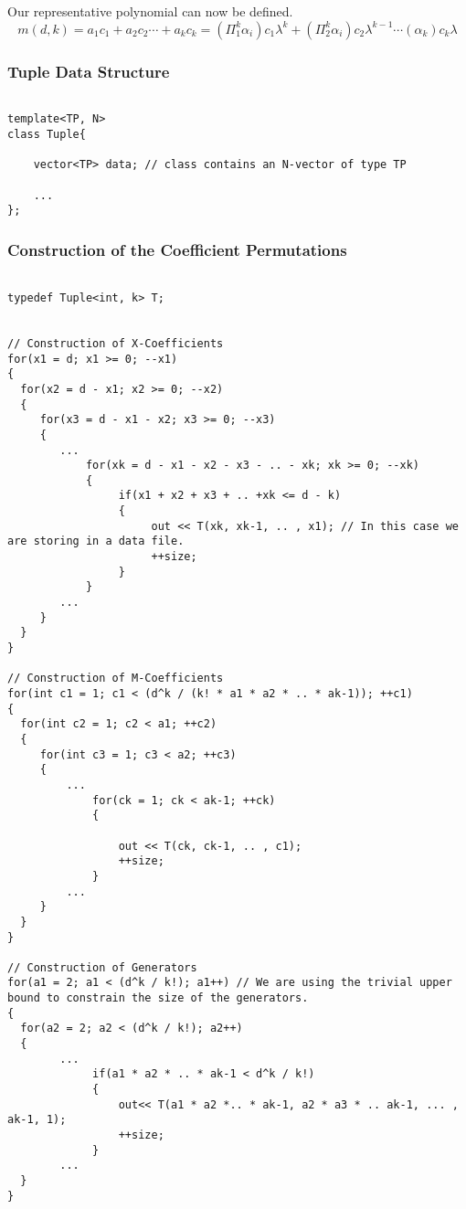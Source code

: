 Our representative polynomial can now be defined.
\[
m(d, k) = a_{1}c_{1} + a_{2}c_{2} \cdots + a_{k}c_{k} = (\Pi_{1}^{k}\alpha_{i})c_{1}\lambda^k + (\Pi_{2}^{k}\alpha_{i})c_{2}\lambda^{k-1} \cdots (\alpha_{k})c_{k}\lambda
\]


\subsubsection*{Tuple Data Structure}

\begin{lstlisting}

template<TP, N>
class Tuple{

    vector<TP> data; // class contains an N-vector of type TP

    ...
};

\end{lstlisting}

\subsubsection*{Construction of the Coefficient Permutations}

\begin{lstlisting}

typedef Tuple<int, k> T;


// Construction of X-Coefficients
for(x1 = d; x1 >= 0; --x1)
{
  for(x2 = d - x1; x2 >= 0; --x2)
  {
     for(x3 = d - x1 - x2; x3 >= 0; --x3) 
     {
        ...
            for(xk = d - x1 - x2 - x3 - .. - xk; xk >= 0; --xk)
            {
                 if(x1 + x2 + x3 + .. +xk <= d - k)
                 {
                      out << T(xk, xk-1, .. , x1); // In this case we are storing in a data file.
                      ++size;
                 }
            }
        ...
     }	
  }
}

// Construction of M-Coefficients
for(int c1 = 1; c1 < (d^k / (k! * a1 * a2 * .. * ak-1)); ++c1)
{
  for(int c2 = 1; c2 < a1; ++c2)
  {
     for(int c3 = 1; c3 < a2; ++c3)
     {
         ...
             for(ck = 1; ck < ak-1; ++ck)
             {

                 out << T(ck, ck-1, .. , c1);
                 ++size;
             }
         ...
     }
  }
}

// Construction of Generators
for(a1 = 2; a1 < (d^k / k!); a1++) // We are using the trivial upper bound to constrain the size of the generators.
{
  for(a2 = 2; a2 < (d^k / k!); a2++)
  {
        ...
             if(a1 * a2 * .. * ak-1 < d^k / k!)
             {
                 out<< T(a1 * a2 *.. * ak-1, a2 * a3 * .. ak-1, ... , ak-1, 1);
                 ++size;
             }
        ...
  }
}


\end{lstlisting}

